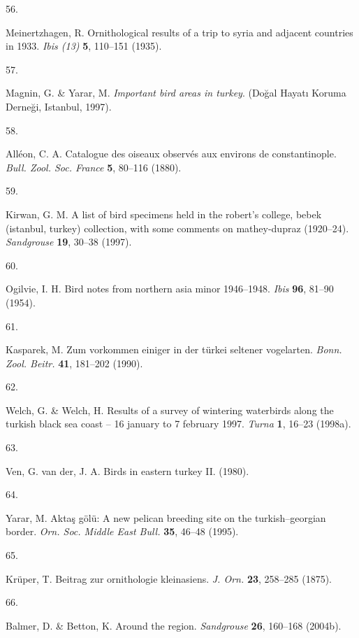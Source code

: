 \documentclass[
  letterpaper,
  DIV=11,
  numbers=noendperiod]{scrreprt}
\newlength{\cslhangindent}
\newlength{\csllabelwidth}
\newenvironment{CSLReferences}[2] %
 {\begin{list}{}{%
  \setlength{\itemindent}{0pt}
  \setlength{\leftmargin}{0pt}
  \setlength{\parsep}{0pt}
  \ifodd #1
   \setlength{\leftmargin}{\cslhangindent}
   \setlength{\itemindent}{-1\cslhangindent}
  \fi
  \setlength{\itemsep}{#2\baselineskip}}}
 {\end{list}}
\newcommand{\CSLLeftMargin}[1]{\parbox[t]{\csllabelwidth}{\strut#1\strut}}
\newcommand{\CSLRightInline}[1]{\parbox[t]{\linewidth - \csllabelwidth}{\strut#1\strut}}
\begin{document}
\begin{CSLReferences}{0}{0}
\CSLLeftMargin{56. }%
\CSLRightInline{Meinertzhagen, R. Ornithological results of a trip to
syria and adjacent countries in 1933. \emph{Ibis (13)} \textbf{5},
110--151 (1935).}

\CSLLeftMargin{57. }%
\CSLRightInline{Magnin, G. \& Yarar, M. \emph{Important bird areas in
turkey}. (Doğal Hayatı Koruma Derneği, Istanbul, 1997).}

\CSLLeftMargin{58. }%
\CSLRightInline{Alléon, C. A. Catalogue des oiseaux observés aux
environs de constantinople. \emph{Bull. Zool. Soc. France} \textbf{5},
80--116 (1880).}

\CSLLeftMargin{59. }%
\CSLRightInline{Kirwan, G. M. A list of bird specimens held in the
robert's college, bebek (istanbul, turkey) collection, with some
comments on mathey-dupraz (1920--24). \emph{Sandgrouse} \textbf{19},
30--38 (1997).}

\CSLLeftMargin{60. }%
\CSLRightInline{Ogilvie, I. H. Bird notes from northern asia minor
1946--1948. \emph{Ibis} \textbf{96}, 81--90 (1954).}

\CSLLeftMargin{61. }%
\CSLRightInline{Kasparek, M. Zum vorkommen einiger in der türkei
seltener vogelarten. \emph{Bonn. Zool. Beitr.} \textbf{41}, 181--202
(1990).}

\CSLLeftMargin{62. }%
\CSLRightInline{Welch, G. \& Welch, H. Results of a survey of wintering
waterbirds along the turkish black sea coast -- 16 january to 7 february
1997. \emph{Turna} \textbf{1}, 16--23 (1998a).}

\CSLLeftMargin{63. }%
\CSLRightInline{Ven, G. van der, J. A. Birds in eastern turkey II.
(1980).}

\CSLLeftMargin{64. }%
\CSLRightInline{Yarar, M. Aktaş gölü: A new pelican breeding site on the
turkish--georgian border. \emph{Orn. Soc. Middle East Bull.}
\textbf{35}, 46--48 (1995).}

\CSLLeftMargin{65. }%
\CSLRightInline{Krüper, T. Beitrag zur ornithologie kleinasiens.
\emph{J. Orn.} \textbf{23}, 258--285 (1875).}

\CSLLeftMargin{66. }%
\CSLRightInline{Balmer, D. \& Betton, K. Around the region.
\emph{Sandgrouse} \textbf{26}, 160--168 (2004b).}


\end{CSLReferences}
\end{document}
